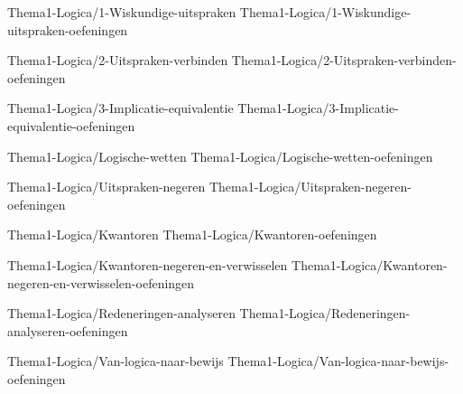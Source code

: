 %





\FVDchapterpair
    {Thema1-Logica/1-Wiskundige-uitspraken}
    {Thema1-Logica/1-Wiskundige-uitspraken-oefeningen}

\FVDchapterpair
    {Thema1-Logica/2-Uitspraken-verbinden}
    {Thema1-Logica/2-Uitspraken-verbinden-oefeningen}

\FVDchapterpair
    {Thema1-Logica/3-Implicatie-equivalentie}
    {Thema1-Logica/3-Implicatie-equivalentie-oefeningen}

\FVDchapterpair
    {Thema1-Logica/Logische-wetten}
    {Thema1-Logica/Logische-wetten-oefeningen}

\FVDchapterpair
    {Thema1-Logica/Uitspraken-negeren}
    {Thema1-Logica/Uitspraken-negeren-oefeningen}

\FVDchapterpair
    {Thema1-Logica/Kwantoren}
    {Thema1-Logica/Kwantoren-oefeningen}

\FVDchapterpair
    {Thema1-Logica/Kwantoren-negeren-en-verwisselen}
    {Thema1-Logica/Kwantoren-negeren-en-verwisselen-oefeningen}

\FVDchapterpair
    {Thema1-Logica/Redeneringen-analyseren}
    {Thema1-Logica/Redeneringen-analyseren-oefeningen}

\FVDchapterpair
    {Thema1-Logica/Van-logica-naar-bewijs}
    {Thema1-Logica/Van-logica-naar-bewijs-oefeningen}



